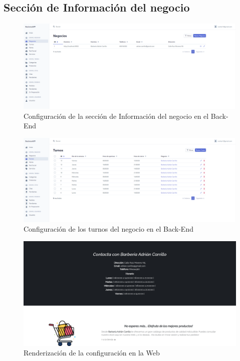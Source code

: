 \subsection{Sección de Información del negocio}

\begin{figure}[H]
  \centering
  \includegraphics[scale=0.2]{images/back-end-info-business.png}
  \caption{Configuración de la sección de Información del negocio en el Back-End}
  \label{}
\end{figure}

\begin{figure}[H]
  \centering
  \includegraphics[scale=0.2]{images/back-end-shifts.png}
  \caption{Configuración de los turnos del negocio en el Back-End}
  \label{}
\end{figure}

\begin{figure}[H]
  \centering
  \includegraphics[scale=0.2]{images/front-end-shifts.png}
  \caption{Renderización de la configuración en la Web}
  \label{}
\end{figure}


